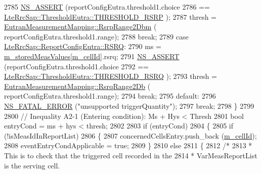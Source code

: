\begin{DoxyCode}
2785             \hyperlink{assert_8h_a6dccdb0de9b252f60088ce281c49d052}{NS\_ASSERT} (reportConfigEutra.threshold1.choice
2786                        == \hyperlink{structns3_1_1LteRrcSap_1_1ThresholdEutra_ad3ed2704b836132980dd2e97cb03822ca0663d5baa9382bd755acb712f6ebf707}{LteRrcSap::ThresholdEutra::THRESHOLD\_RSRP}
      );
2787             thresh = \hyperlink{classns3_1_1EutranMeasurementMapping_a695a24d417b914a41b05a450cc1e1f9e}{EutranMeasurementMapping::RsrpRange2Dbm} (
      reportConfigEutra.threshold1.range);
2788             \textcolor{keywordflow}{break};
2789           \textcolor{keywordflow}{case} \hyperlink{structns3_1_1LteRrcSap_1_1ReportConfigEutra_a82343ddf526faba0483431ea5882a3efaa4e09cb3c7154d7ab732115a2647325f}{LteRrcSap::ReportConfigEutra::RSRQ}:
2790             ms = \hyperlink{classns3_1_1LteUeRrc_a93094dcd5c235b2e2a8a299125100a57}{m\_storedMeasValues}[\hyperlink{classns3_1_1LteUeRrc_aa9d3317734eea9158371d9fccf3a0c48}{m\_cellId}].rsrq;
2791             \hyperlink{assert_8h_a6dccdb0de9b252f60088ce281c49d052}{NS\_ASSERT} (reportConfigEutra.threshold1.choice
2792                        == \hyperlink{structns3_1_1LteRrcSap_1_1ThresholdEutra_ad3ed2704b836132980dd2e97cb03822ca6e8bda2b99825f09f53388c29b6402b4}{LteRrcSap::ThresholdEutra::THRESHOLD\_RSRQ}
      );
2793             thresh = \hyperlink{classns3_1_1EutranMeasurementMapping_a8c1e02fbc1226718eb0914cf13362147}{EutranMeasurementMapping::RsrqRange2Db} (
      reportConfigEutra.threshold1.range);
2794             \textcolor{keywordflow}{break};
2795           \textcolor{keywordflow}{default}:
2796             \hyperlink{group__fatal_ga5131d5e3f75d7d4cbfd706ac456fdc85}{NS\_FATAL\_ERROR} (\textcolor{stringliteral}{"unsupported triggerQuantity"});
2797             \textcolor{keywordflow}{break};
2798           \}
2799 
2800         \textcolor{comment}{// Inequality A2-1 (Entering condition): Ms + Hys < Thresh}
2801         \textcolor{keywordtype}{bool} entryCond = ms + hys < thresh;
2802 
2803         \textcolor{keywordflow}{if} (entryCond)
2804           \{
2805             \textcolor{keywordflow}{if} (!isMeasIdInReportList)
2806               \{
2807                 concernedCellsEntry.push\_back (\hyperlink{classns3_1_1LteUeRrc_aa9d3317734eea9158371d9fccf3a0c48}{m\_cellId});
2808                 eventEntryCondApplicable = \textcolor{keyword}{true};
2809               \}
2810             \textcolor{keywordflow}{else}
2811               \{
2812                 \textcolor{comment}{/*}
2813 \textcolor{comment}{                 * This is to check that the triggered cell recorded in the}
2814 \textcolor{comment}{                 * VarMeasReportList is the serving cell.}

\end{DoxyCode}
